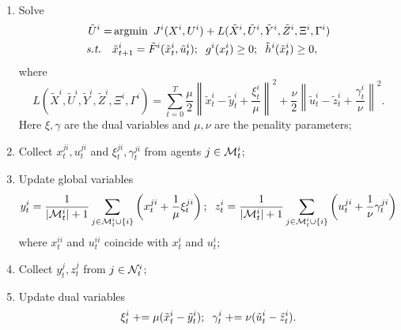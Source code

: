 \documentclass[twoside,11pt]{article}
\begin{document}
\begin{enumerate}
\item Solve
\begin{equation} \label{eq: primal_problem}
\begin{split}
\tilde{U}^i = &\argmin \ J^i(X^i, U^i) + L(\tilde{X}^i, \tilde{U}^i, \tilde{Y}^i, \tilde{Z}^i,\Xi^i, \Gamma^i)\\
\textit{s.t.} \quad & \tilde{x}^i_{t+1} = \tilde{F}^i(\tilde{x}^i_t, \tilde{u}^i_t); \hspace{2mm} g^i(x^i_t)\geq 0; \hspace{2mm} \tilde{h}^i(\tilde{x}^i_t) \geq 0,
\end{split}
\end{equation}
where
\begin{equation}\label{eq: lagrangian}
L(\tilde{X}^i, \tilde{U}^i, \tilde{Y}^i, \tilde{Z}^i,\Xi^i, \Gamma^i) = \sum_{t=0}^T \frac{\mu}{2}\left\|\tilde{x}^i_t-\tilde{y}^i_t + \frac{\xi^i_t}{\mu}\right\|^2 + \frac{\nu}{2}\left\|\tilde{u}^i_t-\tilde{z}^i_t + \frac{\gamma^i_t}{\nu}\right\|^2.
\end{equation}
Here $\xi, \gamma$ are the dual variables and $\mu, \nu$ are the penality parameters;

\item Collect $x^{ji}_t, u^{ji}_t$ and $\xi^{ji}_t, \gamma^{ji}_t$ from agents $j\in{\cal M}^i_t$;

\item Update global variables
\begin{equation} \label{eq: global_update}
y^i_t = \frac{1}{|{\cal M}^i_t|+1}\sum_{j\in{\cal M}^i_t\cup \{i\}}\left(x^{ji}_t + \frac{1}{\mu}\xi^{ji}_t\right); 
\hspace{2mm}
z^i_t = \frac{1}{|{\cal M}^i_t|+1}\sum_{j\in{\cal M}^i_t\cup \{i\}}\left(u^{ji}_t + \frac{1}{\nu}\gamma^{ji}_t\right)
\end{equation}
where $x_t^{ii}$ and $u_t^{ii}$ coincide with $x_t^i$ and $u_t^i$;

\item Collect $y^j_t, z^j_t$ from $j\in{\cal N}^i_t$;

\item Update dual variables
\begin{equation}
\xi^i_t \mathrel{+}= \mu(\tilde{x}^i_t - \tilde{y}^i_t); \hspace{2mm}
\gamma^i_t \mathrel{+}= \nu(\tilde{u}^i_t - \tilde{z}^i_t).\label{eq: dual_update}
\end{equation}
\end{enumerate}
\end{document}
